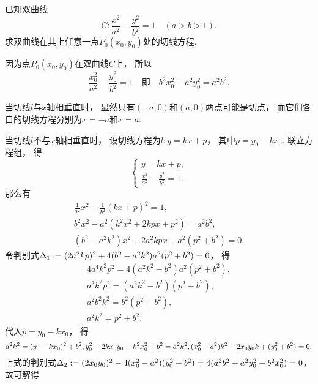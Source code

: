 \begin{example}
已知双曲线\begin{equation*}
	C: \frac{x^2}{a^2} - \frac{y^2}{b^2} = 1
	\quad(a>b>1).
\end{equation*}
求双曲线在其上任意一点\(P_0(x_0,y_0)\)处的切线方程.
\begin{solution}
因为点\(P_0(x_0,y_0)\)在双曲线\(C\)上，
所以\begin{equation*}
	\frac{x_0^2}{a^2} - \frac{y_0^2}{b^2} = 1
	\quad\text{即}\quad
	b^2 x_0^2 - a^2 y_0^2 = a^2 b^2.
\end{equation*}

当切线\(l\)与\(x\)轴相垂直时，
显然只有\((-a,0)\)和\((a,0)\)两点可能是切点，
而它们各自的切线方程分别为\(x=-a\)和\(x=a\).

当切线\(l\)不与\(x\)轴相垂直时，
设切线方程为\(l: y = kx + p\)，
其中\(p = y_0 - k x_0\).
联立方程组，
得\begin{equation*}
	\begin{cases}
		y = kx + p, \\
		\frac{x^2}{a^2} - \frac{y^2}{b^2} = 1.
	\end{cases}
\end{equation*}
那么有\begin{gather*}
	\frac{1}{a^2} x^2 - \frac{1}{b^2} (kx+p)^2 = 1, \\
	b^2 x^2 - a^2 (k^2 x^2 + 2kpx + p^2) = a^2 b^2, \\
	(b^2 - a^2 k^2) x^2 - 2 a^2 k p x - a^2 (p^2 + b^2) = 0.
\end{gather*}
令判别式\(\Delta_1 := (2 a^2 k p)^2 + 4 (b^2 - a^2 k^2) a^2 (p^2 + b^2) = 0\)，
得\begin{gather*}
	4 a^4 k^2 p^2 = 4 (a^2 k^2 - b^2) a^2 (p^2 + b^2), \\
	a^2 k^2 p^2 = (a^2 k^2 - b^2)(p^2 + b^2), \\
	a^2 b^2 k^2 = b^2(p^2 + b^2), \\
	a^2 k^2 = p^2 + b^2,
\end{gather*}
代入\(p = y_0 - k x_0\)，
得\begin{equation*}
	a^2 k^2 = (y_0 - k x_0)^2 + b^2, \\
	y_0^2 - 2k x_0 y_0 + k^2 x_0^2 + b^2 = a^2 k^2, \\
	(x_0^2 - a^2) k^2 - 2 x_0 y_0 k + (y_0^2 + b^2) = 0.
\end{equation*}
上式的判别式\(
	\Delta_2
	:= (2 x_0 y_0)^2 - 4(x_0^2 - a^2)(y_0^2 + b^2)
	= 4(a^2 b^2 + a^2 y_0^2 - b^2 x_0^2)
	= 0
\)，
故可解得\begin{equation*}

\end{equation*}
\end{solution}
\end{example}
